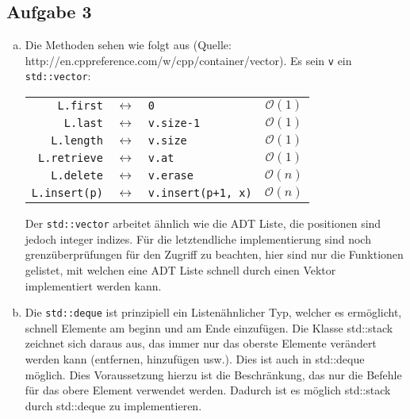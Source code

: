 \documentclass[11pt]{article}
\begin{document}
\subsection*{Aufgabe 3}
\begin{enumerate}[a)]
  \item 
    Die Methoden sehen wie folgt aus (Quelle: http://en.cppreference.com/w/cpp/container/vector). 
    Es sein \texttt{v} ein \texttt{std::vector}: 

    \begin{centering}
      \begin{tabular}{r c l c}
        \texttt{L.first}     & $\leftrightarrow$ & \texttt{0}       &   $\mathcal{O}(1)$\\
        \texttt{L.last}      & $\leftrightarrow$ & \texttt{v.size-1} &   $\mathcal{O}(1)$\\
        \texttt{L.length}    & $\leftrightarrow$ & \texttt{v.size  }   &   $\mathcal{O}(1)$\\
        \texttt{L.retrieve}  & $\leftrightarrow$ & \texttt{v.at    }   &   $\mathcal{O}(1)$\\
        \texttt{L.delete}    & $\leftrightarrow$ & \texttt{v.erase }  &   $\mathcal{O}(n)$\\
        \texttt{L.insert(p)}    & $\leftrightarrow$ & \texttt{v.insert(p+1, x)} &   $\mathcal{O}(n)$
      \end{tabular}
    \end{centering}

    Der \texttt{std::vector} arbeitet \"ahnlich wie die ADT Liste,
    die positionen sind jedoch integer indizes. F\"ur die letztendliche
    implementierung sind noch grenz\"uberpr\"ufungen f\"ur den Zugriff
    zu beachten, hier sind nur die Funktionen gelistet, mit welchen eine 
    ADT Liste schnell durch einen Vektor implementiert werden kann.
    

  \item

    Die \texttt{std::deque} ist prinzipiell ein Listen\"ahnlicher Typ,
    welcher es erm\"oglicht, schnell Elemente am beginn und am 
    Ende einzuf\"ugen.  Die Klasse std::stack zeichnet sich daraus
    aus, das immer nur das oberste Elemente verändert werden kann (entfernen,
    hinzufügen usw.). Dies ist auch in std::deque möglich. Dies Voraussetzung
    hierzu ist die Beschränkung, das nur die Befehle für das obere Element
    verwendet werden. Dadurch ist es möglich std::stack durch std::deque zu
    implementieren. 


\end{enumerate}
\end{document}
